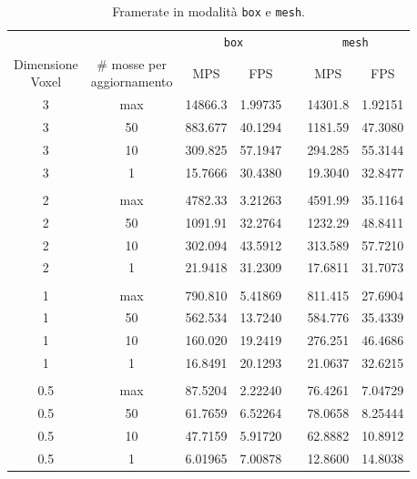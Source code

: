 \begin{center}
  \begin{table}[htbp]
   \centering
      \begin{tabular}{*{7}{c}}
        \toprule
          & & \multicolumn{2}{c}{\texttt{box}} & & \multicolumn{2}{c}{\texttt{mesh}}\\
        \cmidrule(r){3-4}\cmidrule(r){6-7}
          \shortstack{Dimensione \\Voxel} & \shortstack{\# mosse per\\aggiornamento} & MPS & FPS & & MPS & FPS \\
        \midrule
          3   & max      & 14866.3      &  1.99735  & & 14301.8      &  1.92151     \\
          3   & 50       & 883.677      &  40.1294  & & 1181.59      &  47.3080     \\
          3   & 10       & 309.825      &  57.1947  & & 294.285      &  55.3144     \\
          3   & 1        & 15.7666      &  30.4380  & & 19.3040      &  32.8477     \\ \\
          2   & max      & 4782.33      &  3.21263  & & 4591.99      &  35.1164     \\
          2   & 50       & 1091.91      &  32.2764  & & 1232.29      &  48.8411     \\
          2   & 10       & 302.094      &  43.5912  & & 313.589      &  57.7210     \\
          2   & 1        & 21.9418      &  31.2309  & & 17.6811      &  31.7073     \\  \\
          1   & max      & 790.810      &  5.41869  & & 811.415      &  27.6904     \\
          1   & 50       & 562.534      &  13.7240  & & 584.776      &  35.4339     \\
          1   & 10       & 160.020      &  19.2419  & & 276.251      &  46.4686     \\
          1   & 1        & 16.8491      &  20.1293  & & 21.0637      &  32.6215     \\ \\
          0.5 & max      & 87.5204      &  2.22240  & & 76.4261      &  7.04729     \\
          0.5 & 50       & 61.7659      &  6.52264  & & 78.0658      &  8.25444     \\
          0.5 & 10       & 47.7159      &  5.91720  & & 62.8882      &  10.8912     \\
          0.5 & 1        & 6.01965      &  7.00878  & & 12.8600      &  14.8038     \\
        \bottomrule
      \end{tabular}
      \caption{Framerate in modalità \texttt{box} e \texttt{mesh}.}
      \label{tab:fps}
  \end{table}
\end{center}

